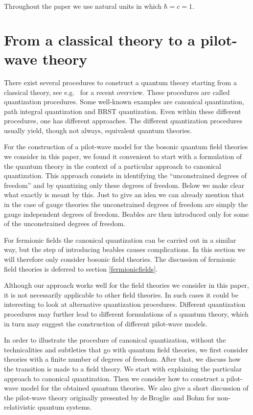 \documentclass[12pt]{article}
\newcommand{\db}{de$\,$Broglie}
\begin{document}
Throughout the paper we use natural units in which $\hbar=c=1$.


\section{From a classical theory to a pilot-wave theory}
There exist several procedures to construct a quantum theory starting from a classical theory, see e.g.\ \cite{twarequeali04} for a recent overview. These procedures are called quantization procedures. Some well-known examples are canonical quantization, path integral quantization and BRST quantization. Even within these different procedures, one has different approaches. The different quantization procedures usually yield, though not always, equivalent quantum theories. 

For the construction of a pilot-wave model for the bosonic quantum field theories we consider in this paper, we found it convenient to start with a formulation of the quantum theory in the context of a particular approach to canonical quantization. This approach consists in identifying the ``unconstrained degrees of freedom'' and by quantizing only these degrees of freedom. Below we make clear what exactly is meant by this. Just to give an idea we can already mention that in the case of gauge theories the unconstrained degrees of freedom are simply the gauge independent degrees of freedom. Beables are then introduced only for some of the unconstrained degrees of freedom.

For fermionic fields the canonical quantization can be carried out in a similar way, but the step of introducing beables causes complications. In this section we will therefore only consider bosonic field theories. The discussion of fermionic field theories is deferred to section \ref{fermionicfields}.

Although our approach works well for the field theories we consider in this paper, it is not necessarily applicable to other field theories. In such cases it could be interesting to look at alternative quantization procedures. Different quantization procedures may further lead to different formulations of a quantum theory, which in turn may suggest the construction of different pilot-wave models. 

In order to illustrate the procedure of canonical quantization, without the technicalities and subtleties that go with quantum field theories, we first consider theories with a finite number of degrees of freedom. After that, we discuss how the transition is made to a field theory. We start with explaining the particular approach to canonical quantization. Then we consider how to construct a pilot-wave model for the obtained quantum theories. We also give a short discussion of the pilot-wave theory originally presented by \db\ and Bohm for non-relativistic quantum systems. 
\end{document}
